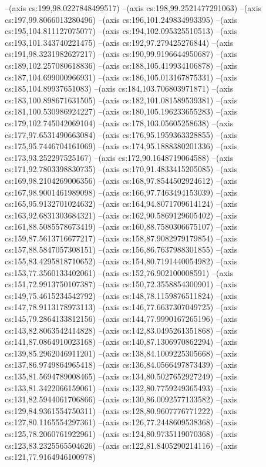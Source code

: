 --(axis cs:199,98.0227848499517)
--(axis cs:198,99.2521477291063)
--(axis cs:197,99.8066013280496)
--(axis cs:196,101.249834993395)
--(axis cs:195,104.811127075077)
--(axis cs:194,102.095325510513)
--(axis cs:193,101.343740221475)
--(axis cs:192,97.279425276844)
--(axis cs:191,98.3231982627217)
--(axis cs:190,99.9196644950687)
--(axis cs:189,102.257080618836)
--(axis cs:188,105.419934106878)
--(axis cs:187,104.699000966931)
--(axis cs:186,105.013167875331)
--(axis cs:185,104.89937651083)
--(axis cs:184,103.706803971871)
--(axis cs:183,100.898671631505)
--(axis cs:182,101.081589539381)
--(axis cs:181,100.530986924227)
--(axis cs:180,105.196233655283)
--(axis cs:179,102.745042069104)
--(axis cs:178,103.05605258638)
--(axis cs:177,97.6531490663084)
--(axis cs:176,95.1959363328855)
--(axis cs:175,95.7446704161069)
--(axis cs:174,95.1888380201336)
--(axis cs:173,93.252297525167)
--(axis cs:172,90.1648719064588)
--(axis cs:171,92.7803398830735)
--(axis cs:170,91.4833415205085)
--(axis cs:169,98.2104269006356)
--(axis cs:168,97.8544502924612)
--(axis cs:167,98.9001461989098)
--(axis cs:166,97.7463494153039)
--(axis cs:165,95.9132701024632)
--(axis cs:164,94.8071709614124)
--(axis cs:163,92.6831303684321)
--(axis cs:162,90.5869129605402)
--(axis cs:161,88.5085578673419)
--(axis cs:160,88.7580306675107)
--(axis cs:159,87.5613716677217)
--(axis cs:158,87.9082979179854)
--(axis cs:157,88.5847057308151)
--(axis cs:156,86.7637988301855)
--(axis cs:155,83.4295818710652)
--(axis cs:154,80.7191440054982)
--(axis cs:153,77.3560133402061)
--(axis cs:152,76.902100008591)
--(axis cs:151,72.9913750107387)
--(axis cs:150,72.3558854300901)
--(axis cs:149,75.4615234542792)
--(axis cs:148,78.1159876511824)
--(axis cs:147,78.9113178973113)
--(axis cs:146,77.6637307049725)
--(axis cs:145,79.2864133812156)
--(axis cs:144,77.9990167265196)
--(axis cs:143,82.8063542414828)
--(axis cs:142,83.0495261351868)
--(axis cs:141,87.0864910023168)
--(axis cs:140,87.1306970862294)
--(axis cs:139,85.2962046911201)
--(axis cs:138,84.1009225305668)
--(axis cs:137,86.9749864965418)
--(axis cs:136,84.0566497873439)
--(axis cs:135,81.5694789008465)
--(axis cs:134,80.5027652927249)
--(axis cs:133,81.3422066159061)
--(axis cs:132,80.7759249365493)
--(axis cs:131,82.5944061706866)
--(axis cs:130,86.0092577133582)
--(axis cs:129,84.9361554750311)
--(axis cs:128,80.9607776771222)
--(axis cs:127,80.1165554297361)
--(axis cs:126,77.2448609538368)
--(axis cs:125,78.2060761922961)
--(axis cs:124,80.9735119070368)
--(axis cs:123,83.2325565504626)
--(axis cs:122,81.8405290214116)
--(axis cs:121,77.9164946100978)
